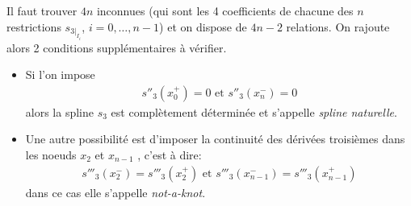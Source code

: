 Il faut trouver $4n$ inconnues (qui sont les 4 coefficients de chacune des $n$ 
restrictions $s_{3|_{I_i}}$, $i=0,\dots,n-1$) et on dispose de $4n-2$ relations. 
On rajoute alors 2 conditions supplémentaires à vérifier.
\begin{itemize}
	\item Si l'on impose
	\begin{eqnarray*}
		s''_3(x_0^+)=0\text{ et }s''_3(x_n^-)=0
	\end{eqnarray*}
	alors la spline $s_3$ est complètement déterminée et s’appelle 
	\emph{spline naturelle}.
	
	\item Une autre possibilité est d’imposer la continuité des dérivées troisièmes 
	dans les noeuds $x_2$ et $x_{n-1}$ , c’est à dire:
	\begin{eqnarray*}
		s'''_3(x_2^-)=s'''_3(x_2^+)\text{ et }s'''_3(x_{n-1}^-)=s'''_3(x_{n-1}^+)
	\end{eqnarray*}
	dans ce cas elle s'appelle \emph{not-a-knot}.
\end{itemize}